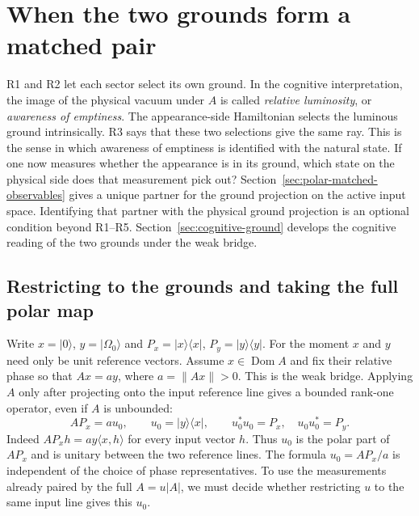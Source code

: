 \documentclass[11pt]{article}
\theoremstyle{definition}
\newcommand{\ket}[1]{\lvert #1\rangle}
\newcommand{\bra}[1]{\langle #1\rvert}
\begin{document}
\section{When the two grounds form a matched pair}
\label{sec:ground-correspondence}

R1 and R2 let each sector select its own ground. In the cognitive interpretation, the image of the physical vacuum under $A$ is called \emph{relative luminosity}, or \emph{awareness of emptiness}. The appearance-side Hamiltonian selects the luminous ground intrinsically. R3 says that these two selections give the same ray. This is the sense in which awareness of emptiness is identified with the natural state. If one now measures whether the appearance is in its ground, which state on the physical side does that measurement pick out? Section~\ref{sec:polar-matched-observables} gives a unique partner for the ground projection on the active input space. Identifying that partner with the physical ground projection is an optional condition beyond R1--R5. Section~\ref{sec:cognitive-ground} develops the cognitive reading of the two grounds under the weak bridge.

\subsection{Restricting to the grounds and taking the full polar map}

Write $x=\ket{0}$, $y=\ket{\Omega_0}$ and $P_x=\ket{x}\!\bra{x}$, $P_y=\ket{y}\!\bra{y}$. For the moment $x$ and $y$ need only be unit reference vectors. Assume $x\in\operatorname{Dom} A$ and fix their relative phase so that $Ax=a y$, where $a=\|Ax\|>0$. This is the weak bridge. Applying $A$ only after projecting onto the input reference line gives a bounded rank-one operator, even if $A$ is unbounded:
\begin{equation}
 AP_x=a u_0,\qquad
 u_0=\ket{y}\!\bra{x},\qquad
 u_0^*u_0=P_x,\quad u_0u_0^*=P_y .
 \label{eq:restricted-ground-orientation}
\end{equation}
Indeed $AP_x h=ay\langle x,h\rangle$ for every input vector $h$. Thus $u_0$ is the polar part of $AP_x$ and is unitary between the two reference lines. The formula $u_0=AP_x/a$ is independent of the choice of phase representatives. To use the measurements already paired by the full $A=u|A|$, we must decide whether restricting $u$ to the same input line gives this $u_0$.
\end{document}
